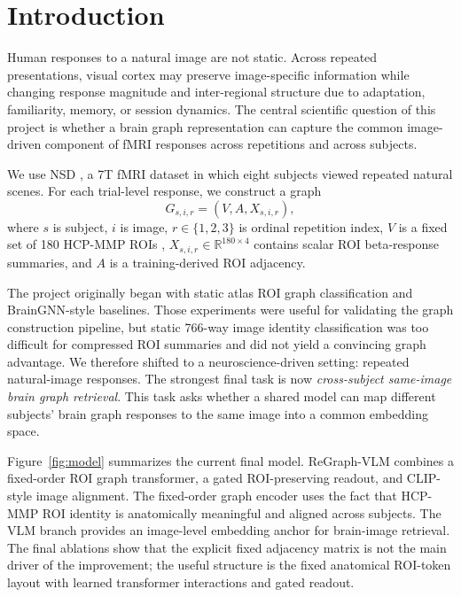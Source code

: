 \documentclass{article}
\begin{document}
\section{Introduction}

Human responses to a natural image are not static. Across repeated presentations, visual cortex may preserve image-specific information while changing response magnitude and inter-regional structure due to adaptation, familiarity, memory, or session dynamics. The central scientific question of this project is whether a brain graph representation can capture the common image-driven component of fMRI responses across repetitions and across subjects.

We use NSD \citep{allen2022nsd}, a 7T fMRI dataset in which eight subjects viewed repeated natural scenes. For each trial-level response, we construct a graph
\begin{equation}
  G_{s,i,r} = (V, A, X_{s,i,r}),
\end{equation}
where $s$ is subject, $i$ is image, $r \in \{1,2,3\}$ is ordinal repetition index, $V$ is a fixed set of 180 HCP-MMP ROIs \citep{glasser2016mmp}, $X_{s,i,r}\in\mathbb{R}^{180\times4}$ contains scalar ROI beta-response summaries, and $A$ is a training-derived ROI adjacency.

The project originally began with static atlas ROI graph classification and BrainGNN-style baselines. Those experiments were useful for validating the graph construction pipeline, but static 766-way image identity classification was too difficult for compressed ROI summaries and did not yield a convincing graph advantage. We therefore shifted to a neuroscience-driven setting: repeated natural-image responses. The strongest final task is now \emph{cross-subject same-image brain graph retrieval}. This task asks whether a shared model can map different subjects' brain graph responses to the same image into a common embedding space.

Figure~\ref{fig:model} summarizes the current final model. ReGraph-VLM combines a fixed-order ROI graph transformer, a gated ROI-preserving readout, and CLIP-style image alignment. The fixed-order graph encoder uses the fact that HCP-MMP ROI identity is anatomically meaningful and aligned across subjects. The VLM branch provides an image-level embedding anchor for brain-image retrieval. The final ablations show that the explicit fixed adjacency matrix is not the main driver of the improvement; the useful structure is the fixed anatomical ROI-token layout with learned transformer interactions and gated readout.
\end{document}

